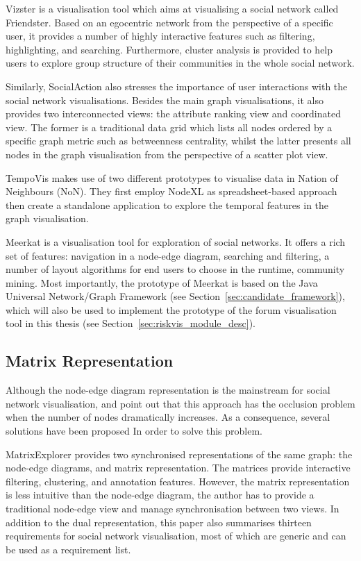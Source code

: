 Vizster \citep{Heer2005a} is a visualisation tool which aims at visualising a social network called Friendster. Based on an egocentric network from the perspective of a specific user, it provides a number of highly interactive features such as filtering, highlighting, and searching. Furthermore, cluster analysis is provided to help users to explore group structure of their communities in the whole social network.

Similarly, SocialAction \citep{Perer2006} also stresses the importance of user interactions with the social network visualisations. Besides the main graph visualisations, it also provides two interconnected views: the attribute ranking view and coordinated view. The former is a traditional data grid which lists all nodes ordered by a specific graph metric such as betweenness centrality, whilst the latter presents all nodes in the graph visualisation from the perspective of a scatter plot view.

TempoVis \citep{Ahn2011} makes use of two different prototypes to visualise data in Nation of Neighbours (NoN). They first employ NodeXL \citep{Hansen2010} as spreadsheet-based approach then create a standalone application to explore the temporal features in the graph visualisation.

Meerkat \citep{Chen2010a} is a visualisation tool for exploration of social networks. It offers a rich set of features: navigation in a node-edge diagram, searching and filtering, a number of layout algorithms for end users to choose in the runtime, community mining. Most importantly, the prototype of Meerkat is based on the Java Universal Network/Graph Framework (see Section~\ref{sec:candidate_framework}), which will also be used to implement the prototype of the forum visualisation tool in this thesis (see Section~\ref{sec:riskvis_module_desc}).

\subsection{Matrix Representation}
Although the node-edge diagram representation is the mainstream for social network visualisation, \citep{Ghoniem2004} and \citep{Keller2006} point out that this approach has the occlusion problem when the number of nodes dramatically increases. As a consequence, several solutions have been proposed In order to solve this problem.

MatrixExplorer \citep{Henry2006} provides two synchronised representations of the same graph: the node-edge diagrams, and matrix representation. The matrices provide interactive filtering, clustering, and annotation features. However, the matrix representation is less intuitive than the node-edge diagram, the author has to provide a traditional node-edge view and manage synchronisation between two views. In addition to the dual representation, this paper also summarises thirteen requirements for social network visualisation, most of which are generic and can be used as a requirement list.

